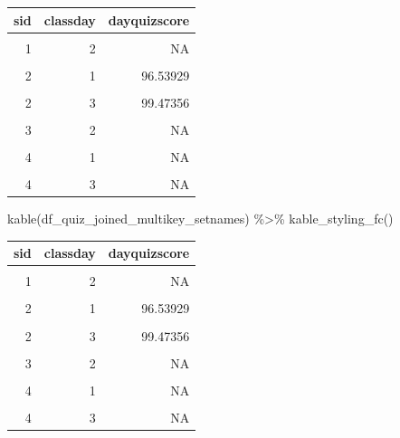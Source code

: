\documentclass[
]{book}
\newenvironment{Shaded}{\begin{snugshade}}{\end{snugshade}}
\newcommand{\FunctionTok}[1]{\textcolor[rgb]{0.00,0.00,0.00}{#1}}
\newcommand{\NormalTok}[1]{#1}
\newcommand{\SpecialCharTok}[1]{\textcolor[rgb]{0.00,0.00,0.00}{#1}}
\begin{document}
\begin{table}[!h]
\centering
\begin{tabular}{r|r|r}
\hline
sid & classday & dayquizscore\\
\hline
\cellcolor{gray!6}{1} & \cellcolor{gray!6}{1} & \cellcolor{gray!6}{89.88726}\\
\hline
1 & 2 & NA\\
\hline
\cellcolor{gray!6}{1} & \cellcolor{gray!6}{3} & \cellcolor{gray!6}{NA}\\
\hline
2 & 1 & 96.53929\\
\hline
\cellcolor{gray!6}{2} & \cellcolor{gray!6}{2} & \cellcolor{gray!6}{65.59195}\\
\hline
2 & 3 & 99.47356\\
\hline
\cellcolor{gray!6}{3} & \cellcolor{gray!6}{1} & \cellcolor{gray!6}{NA}\\
\hline
3 & 2 & NA\\
\hline
\cellcolor{gray!6}{3} & \cellcolor{gray!6}{3} & \cellcolor{gray!6}{NA}\\
\hline
4 & 1 & NA\\
\hline
\cellcolor{gray!6}{4} & \cellcolor{gray!6}{2} & \cellcolor{gray!6}{97.36936}\\
\hline
4 & 3 & NA\\
\hline
\end{tabular}
\end{table}

\begin{Shaded}
\begin{Highlighting}[]
\FunctionTok{kable}\NormalTok{(df\_quiz\_joined\_multikey\_setnames) }\SpecialCharTok{\%\textgreater{}\%}
  \FunctionTok{kable\_styling\_fc}\NormalTok{()}
\end{Highlighting}
\end{Shaded}

\begin{table}[!h]
\centering
\begin{tabular}{r|r|r}
\hline
sid & classday & dayquizscore\\
\hline
\cellcolor{gray!6}{1} & \cellcolor{gray!6}{1} & \cellcolor{gray!6}{89.88726}\\
\hline
1 & 2 & NA\\
\hline
\cellcolor{gray!6}{1} & \cellcolor{gray!6}{3} & \cellcolor{gray!6}{NA}\\
\hline
2 & 1 & 96.53929\\
\hline
\cellcolor{gray!6}{2} & \cellcolor{gray!6}{2} & \cellcolor{gray!6}{65.59195}\\
\hline
2 & 3 & 99.47356\\
\hline
\cellcolor{gray!6}{3} & \cellcolor{gray!6}{1} & \cellcolor{gray!6}{NA}\\
\hline
3 & 2 & NA\\
\hline
\cellcolor{gray!6}{3} & \cellcolor{gray!6}{3} & \cellcolor{gray!6}{NA}\\
\hline
4 & 1 & NA\\
\hline
\cellcolor{gray!6}{4} & \cellcolor{gray!6}{2} & \cellcolor{gray!6}{97.36936}\\
\hline
4 & 3 & NA\\
\hline
\end{tabular}
\end{table}
\end{document}
